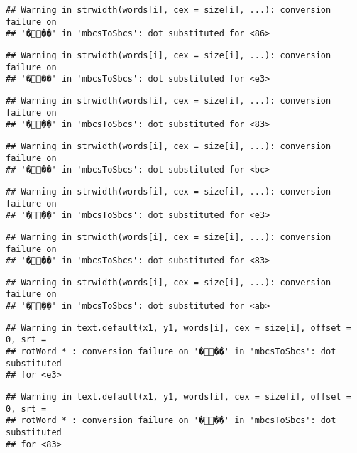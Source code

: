 \documentclass[]{article}
\begin{document}
\begin{verbatim}
## Warning in strwidth(words[i], cex = size[i], ...): conversion failure on
## '���' in 'mbcsToSbcs': dot substituted for <86>
\end{verbatim}

\begin{verbatim}
## Warning in strwidth(words[i], cex = size[i], ...): conversion failure on
## '���' in 'mbcsToSbcs': dot substituted for <e3>
\end{verbatim}

\begin{verbatim}
## Warning in strwidth(words[i], cex = size[i], ...): conversion failure on
## '���' in 'mbcsToSbcs': dot substituted for <83>
\end{verbatim}

\begin{verbatim}
## Warning in strwidth(words[i], cex = size[i], ...): conversion failure on
## '���' in 'mbcsToSbcs': dot substituted for <bc>
\end{verbatim}

\begin{verbatim}
## Warning in strwidth(words[i], cex = size[i], ...): conversion failure on
## '���' in 'mbcsToSbcs': dot substituted for <e3>
\end{verbatim}

\begin{verbatim}
## Warning in strwidth(words[i], cex = size[i], ...): conversion failure on
## '���' in 'mbcsToSbcs': dot substituted for <83>
\end{verbatim}

\begin{verbatim}
## Warning in strwidth(words[i], cex = size[i], ...): conversion failure on
## '���' in 'mbcsToSbcs': dot substituted for <ab>
\end{verbatim}

\begin{verbatim}
## Warning in text.default(x1, y1, words[i], cex = size[i], offset = 0, srt =
## rotWord * : conversion failure on '���' in 'mbcsToSbcs': dot substituted
## for <e3>
\end{verbatim}

\begin{verbatim}
## Warning in text.default(x1, y1, words[i], cex = size[i], offset = 0, srt =
## rotWord * : conversion failure on '���' in 'mbcsToSbcs': dot substituted
## for <83>
\end{verbatim}
\end{document}
